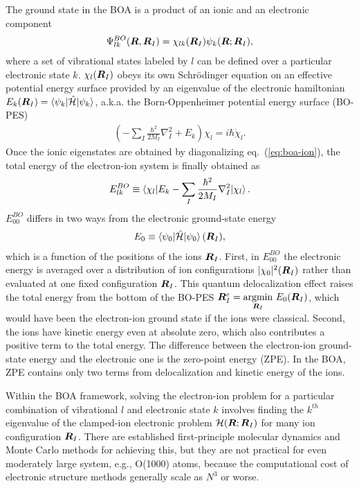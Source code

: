 The ground state in the BOA is a product of an ionic and an electronic component
\begin{align} \label{eq:intro-boa-product}
\Psi_{lk}^{BO}(\boldsymbol{R},\boldsymbol{R}_I) = \chi_{lk}(\boldsymbol{R}_I) \psi_k(\boldsymbol{R};\boldsymbol{R}_I),
\end{align}
where a set of vibrational states labeled by $l$ can be defined over a particular electronic state $k$. $\chi_l(\boldsymbol{R}_I)$ obeys its own Schr\"odinger equation on an effective potential energy surface provided by an eigenvalue of the electronic hamiltonian $E_k(\boldsymbol{R}_I) = \braket{\psi_k|\hat{\mathcal{H}}|\psi_k}$, a.k.a. the Born-Oppenheimer potential energy surface (BO-PES)
\begin{align} \label{eq:boa-ion}
\left(-\sum_I\frac{\hbar^2}{2M_I}\nabla^2_I+E_k\right)\chi_l = i\hbar\dot{\chi}_l.
\end{align}
Once the ionic eigenstates are obtained by diagonalizing eq.~(\ref{eq:boa-ion}), the total energy of the electron-ion system is finally obtained as
\begin{align}
E_{lk}^{BO} \equiv \braket{\chi_l| E_k -\sum_I\frac{\hbar^2}{2M_I}\nabla^2_I |\chi_l}.
\end{align}
$E_{00}^{BO}$ differs in two ways from the electronic ground-state energy
\begin{align}
E_0 \equiv \braket{\psi_0|\hat{\mathcal{H}}|\psi_0}(\boldsymbol{R}_I),
\end{align}
which is a function of the positions of the ions $\boldsymbol{R}_I$. First, in $E_{00}^{BO}$ the electronic energy is averaged over a distribution of ion configurations $\vert\chi_0\vert^2(\boldsymbol{R}_I)$ rather than evaluated at one fixed configuration $\boldsymbol{R}_I$. This quantum delocalization effect raises the total energy from the bottom of the BO-PES $\boldsymbol{R}_I^e=\underset{\boldsymbol{R}_I}{\text{argmin}}~E_0(\boldsymbol{R}_I)$, which would have been the electron-ion ground state if the ions were classical. Second, the ions have kinetic energy even at absolute zero, which also contributes a positive term to the total energy.
The difference between the electron-ion ground-state energy and the electronic one is the zero-point energy (ZPE). In the BOA, ZPE contains only two terms from delocalization and kinetic energy of the ions.

Within the BOA framework, solving the electron-ion problem for a particular combination of vibrational $l$ and electronic state $k$ involves finding the $k^{th}$ eigenvalue of the clamped-ion electronic problem $\mathcal{H}(\boldsymbol{R}; \boldsymbol{R}_I)$ for many ion configuration $\boldsymbol{R}_I$. There are established first-principle molecular dynamics and Monte Carlo methods for achieving this, but they are not practical for even moderately large system, e.g., O(1000) atoms, because the computational cost of electronic structure methods generally scale as $N^3$ or worse.

